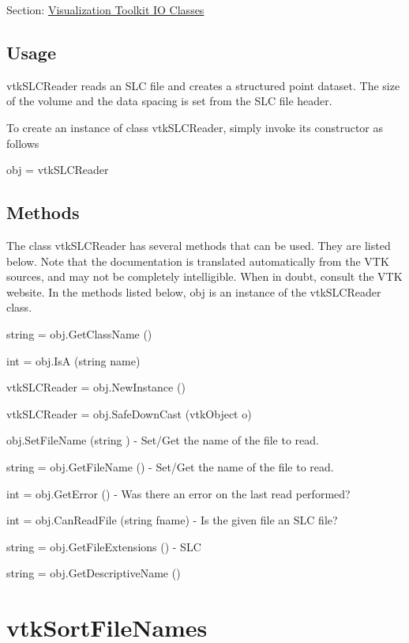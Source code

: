 Section\-: \hyperlink{sec_vtkio}{Visualization Toolkit I\-O Classes} \hypertarget{vtkwidgets_vtkxyplotwidget_Usage}{}\subsection{Usage}\label{vtkwidgets_vtkxyplotwidget_Usage}
vtk\-S\-L\-C\-Reader reads an S\-L\-C file and creates a structured point dataset. The size of the volume and the data spacing is set from the S\-L\-C file header.

To create an instance of class vtk\-S\-L\-C\-Reader, simply invoke its constructor as follows \begin{DoxyVerb}  obj = vtkSLCReader
\end{DoxyVerb}
 \hypertarget{vtkwidgets_vtkxyplotwidget_Methods}{}\subsection{Methods}\label{vtkwidgets_vtkxyplotwidget_Methods}
The class vtk\-S\-L\-C\-Reader has several methods that can be used. They are listed below. Note that the documentation is translated automatically from the V\-T\-K sources, and may not be completely intelligible. When in doubt, consult the V\-T\-K website. In the methods listed below, {\ttfamily obj} is an instance of the vtk\-S\-L\-C\-Reader class. 
\begin{DoxyItemize}
\item {\ttfamily string = obj.\-Get\-Class\-Name ()}  
\item {\ttfamily int = obj.\-Is\-A (string name)}  
\item {\ttfamily vtk\-S\-L\-C\-Reader = obj.\-New\-Instance ()}  
\item {\ttfamily vtk\-S\-L\-C\-Reader = obj.\-Safe\-Down\-Cast (vtk\-Object o)}  
\item {\ttfamily obj.\-Set\-File\-Name (string )} -\/ Set/\-Get the name of the file to read.  
\item {\ttfamily string = obj.\-Get\-File\-Name ()} -\/ Set/\-Get the name of the file to read.  
\item {\ttfamily int = obj.\-Get\-Error ()} -\/ Was there an error on the last read performed?  
\item {\ttfamily int = obj.\-Can\-Read\-File (string fname)} -\/ Is the given file an S\-L\-C file?  
\item {\ttfamily string = obj.\-Get\-File\-Extensions ()} -\/ S\-L\-C  
\item {\ttfamily string = obj.\-Get\-Descriptive\-Name ()}  
\end{DoxyItemize}\hypertarget{vtkio_vtksortfilenames}{}\section{vtk\-Sort\-File\-Names}\label{vtkio_vtksortfilenames}
